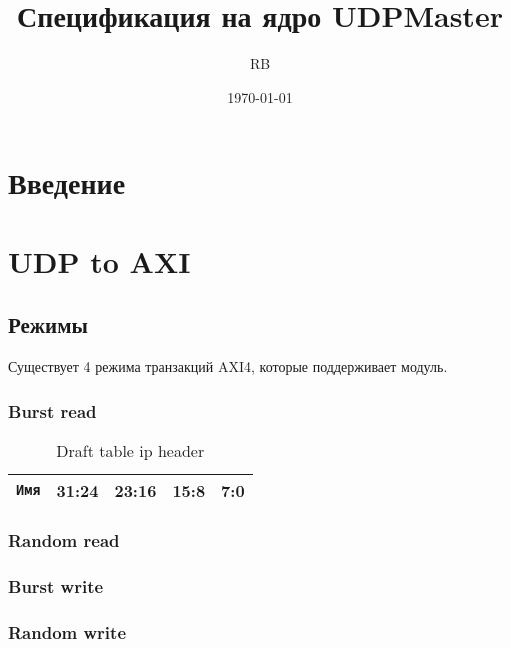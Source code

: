 \documentclass[a4paper,12pt]{article}
\title{\Huge\textbf{Спецификация на ядро UDPMaster}}
\author{\huge RB}
\date{\today}
\begin{document}
	\maketitle
	\newpage
	
	
	\listoffigures
	\newpage
	
	\listoftables
	\newpage
	
	
	\section{Введение}
	\label{sec:introduction}
	
	
	
	\section{UDP to AXI}
	\label{sec:udp2axi}


	\subsection{Режимы}
	\label{subsec:modes_udp2axi}
	Существует 4 режима транзакций AXI4, которые поддерживает модуль. 
	
	\subsubsection{Burst read}
	\label{subsubsec:modes_burst_read}
	

	\begin{table}[H]
		\begin{center}
			\begin{tabular}{lcccc}
				\rowcolor[gray]{0.7} {\tt Имя} & 31:24 & 23:16 & 15:8 & 7:0 \\ \hline \hline
			\end{tabular}
			\caption{Draft table ip header}
			\label{tbl:burst_read_pkt_struct}
		\end{center}
	\end{table}

	\subsubsection{Random read}
	\label{subsubsec:modes_random_read}
	

	\subsubsection{Burst write}
	\label{subsubsec:modes_burst_write}
	
	
	\subsubsection{Random write}
	\label{subsubsec:modes_random_write}
	
	
\end{document}
